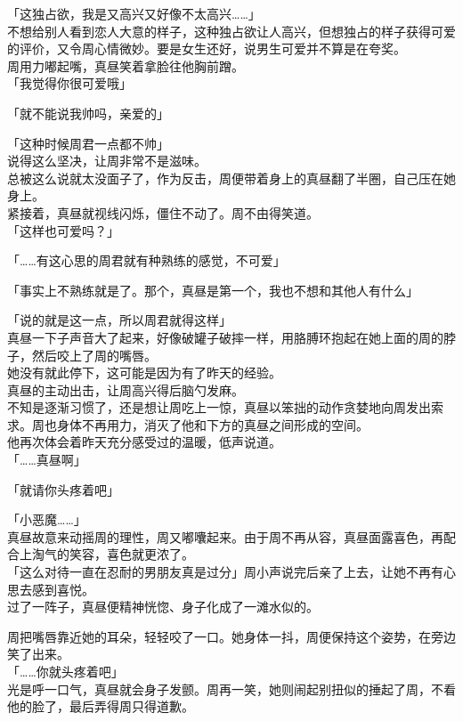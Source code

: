 「这独占欲，我是又高兴又好像不太高兴……」\\

不想给别人看到恋人大意的样子，这种独占欲让人高兴，但想独占的样子获得可爱的评价，又令周心情微妙。要是女生还好，说男生可爱并不算是在夸奖。\\

周用力嘟起嘴，真昼笑着拿脸往他胸前蹭。\\

「我觉得你很可爱哦」

「就不能说我帅吗，亲爱的」

「这种时候周君一点都不帅」\\

说得这么坚决，让周非常不是滋味。\\

总被这么说就太没面子了，作为反击，周便带着身上的真昼翻了半圈，自己压在她身上。\\

紧接着，真昼就视线闪烁，僵住不动了。周不由得笑道。\\

「这样也可爱吗？」

「……有这心思的周君就有种熟练的感觉，不可爱」

「事实上不熟练就是了。那个，真昼是第一个，我也不想和其他人有什么」

「说的就是这一点，所以周君就得这样」\\

真昼一下子声音大了起来，好像破罐子破摔一样，用胳膊环抱起在她上面的周的脖子，然后咬上了周的嘴唇。\\

她没有就此停下，这可能是因为有了昨天的经验。\\

真昼的主动出击，让周高兴得后脑勺发麻。\\

不知是逐渐习惯了，还是想让周吃上一惊，真昼以笨拙的动作贪婪地向周发出索求。周也身体不再用力，消灭了他和下方的真昼之间形成的空间。\\

他再次体会着昨天充分感受过的温暖，低声说道。\\

「……真昼啊」

「就请你头疼着吧」

「小恶魔……」\\

真昼故意来动摇周的理性，周又嘟囔起来。由于周不再从容，真昼面露喜色，再配合上淘气的笑容，喜色就更浓了。\\

「这么对待一直在忍耐的男朋友真是过分」周小声说完后亲了上去，让她不再有心思去感到喜悦。\\

过了一阵子，真昼便精神恍惚、身子化成了一滩水似的。

周把嘴唇靠近她的耳朵，轻轻咬了一口。她身体一抖，周便保持这个姿势，在旁边笑了出来。\\

「……你就头疼着吧」\\

光是呼一口气，真昼就会身子发颤。周再一笑，她则闹起别扭似的捶起了周，不看他的脸了，最后弄得周只得道歉。
